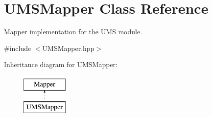 \hypertarget{classUMSMapper}{
\section{UMSMapper Class Reference}
\label{classUMSMapper}
}


\hyperlink{classMapper}{Mapper} implementation for the UMS module.  




{\ttfamily \#include $<$UMSMapper.hpp$>$}

Inheritance diagram for UMSMapper:\begin{figure}[H]
\begin{center}
\leavevmode
\includegraphics[height=2.000000cm]{classUMSMapper}
\end{center}
\end{figure}
